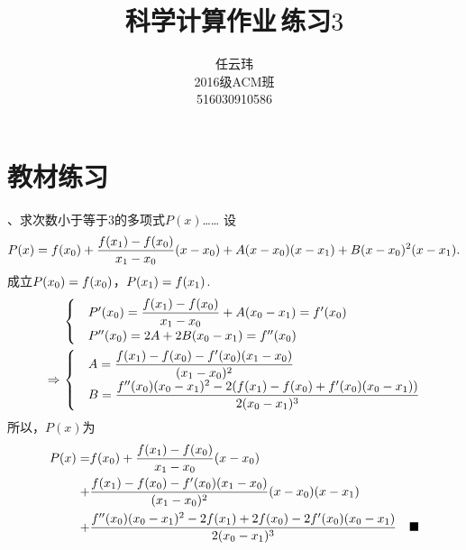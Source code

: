 

\title{科学计算作业$\,$练习$3$}
\author{\small 任云玮\\\small2016级ACM班\\\small516030910586}
\date{}


\maketitle

\section{教材练习}

、求次数小于等于$3$的多项式$P(x)$……
\ans
  设
  \[
    P(x) = \mathnormal{f}(x_0) + \frac{\mathnormal{f}(x_1)-\mathnormal{f}(x_0)}{x_1-x_0}(x-x_0)
    + A(x-x_0)(x-x_1) + B(x-x_0)^2(x-x_1).
  \]
  成立$P(x_0) = \mathnormal{f}(x_0)$，$P(x_1) = \mathnormal{f}(x_1)$.
  \[\begin{split}
    &\begin{cases}
      &P^{\prime}(x_0) = \dfrac{\mathnormal{f}(x_1)-\mathnormal{f}(x_0)}{x_1-x_0} + A(x_0-x_1) = \mathnormal{f}^{\prime}(x_0)\\
      &P^{\prime\prime}(x_0) = 2A + 2B(x_0-x_1) = \mathnormal{f}^{\prime\prime}(x_0)
    \end{cases} \\
    \Rightarrow\,&
    \begin{cases}
      &A = \dfrac{\mathnormal{f}(x_1) - \mathnormal{f}(x_0) - \mathnormal{f}^{\prime}(x_0)(x_1-x_0)}{(x_1-x_0)^2}\\
      &B = \dfrac{\mathnormal{f}^{\prime\prime}(x_0)(x_0-x_1)^2 - 2(\mathnormal{f}(x_1)-\mathnormal{f}(x_0)+\mathnormal{f}^{\prime}(x_0)(x_0-x_1))}
      {2(x_0-x_1)^3}
    \end{cases}
  \end{split}\]
  所以，$P(x)$为
  \[\begin{split}
    P(x)= & \mathnormal{f}(x_0) + \frac{\mathnormal{f}(x_1)-\mathnormal{f}(x_0)}{x_1-x_0}(x-x_0)\\
        + & \dfrac{\mathnormal{f}(x_1) - \mathnormal{f}(x_0) - \mathnormal{f}^{\prime}(x_0)(x_1-x_0)}{(x_1-x_0)^2}(x-x_0)(x-x_1)\\
        + & \dfrac{\mathnormal{f}^{\prime\prime}(x_0)(x_0-x_1)^2 - 2\mathnormal{f}(x_1)+2\mathnormal{f}(x_0)-2\mathnormal{f}^{\prime}(x_0)(x_0-x_1)}
        {2(x_0-x_1)^3}
        \quad\blacksquare
  \end{split}\]

